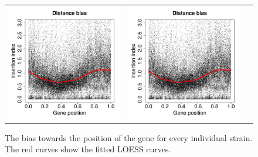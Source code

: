 \documentclass[a4paper,10pt, twocolumn]{article}
\begin{document}
\begin{figure}
\begin{tabular}{c c c}
\includegraphics[page=22, scale=0.22]{biases.pdf} &
\includegraphics[page=24, scale=0.22]{biases.pdf}
\end{tabular}
\caption{The bias towards the position of the gene for every individual strain. The red curves show the fitted LOESS curves.}
\label{fig:distance_bias_individual}
\end{figure}
\end{document}

